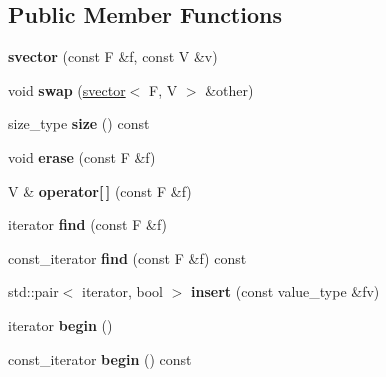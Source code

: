 \subsection*{Public Member Functions}
\begin{DoxyCompactItemize}
\item 
\hypertarget{classsvector_af80c78063c502c408ce9de9e29802c4e}{
{\bfseries svector} (const F \&f, const V \&v)}
\label{classsvector_af80c78063c502c408ce9de9e29802c4e}

\item 
\hypertarget{classsvector_a7f6261a28ccf2e7e38b8921716a35e3b}{
void {\bfseries swap} (\hyperlink{classsvector}{svector}$<$ F, V $>$ \&other)}
\label{classsvector_a7f6261a28ccf2e7e38b8921716a35e3b}

\item 
\hypertarget{classsvector_ad6df678466732e7a17ea1b1223ff7747}{
size\_\-type {\bfseries size} () const }
\label{classsvector_ad6df678466732e7a17ea1b1223ff7747}

\item 
\hypertarget{classsvector_aa7a575ad6a3a810adf89785b4a5d49b3}{
void {\bfseries erase} (const F \&f)}
\label{classsvector_aa7a575ad6a3a810adf89785b4a5d49b3}

\item 
\hypertarget{classsvector_ae1a20b7ecc6899bc36f6c74c09b80f21}{
V \& {\bfseries operator\mbox{[}$\,$\mbox{]}} (const F \&f)}
\label{classsvector_ae1a20b7ecc6899bc36f6c74c09b80f21}

\item 
\hypertarget{classsvector_a8654fa07ce4f88f6f1f781ddd4968da9}{
iterator {\bfseries find} (const F \&f)}
\label{classsvector_a8654fa07ce4f88f6f1f781ddd4968da9}

\item 
\hypertarget{classsvector_ab57caec3eab9d57eaec2ad1c436fc3d6}{
const\_\-iterator {\bfseries find} (const F \&f) const }
\label{classsvector_ab57caec3eab9d57eaec2ad1c436fc3d6}

\item 
\hypertarget{classsvector_a8a296d1d27c0242a6d8c89d4fdf67388}{
std::pair$<$ iterator, bool $>$ {\bfseries insert} (const value\_\-type \&fv)}
\label{classsvector_a8a296d1d27c0242a6d8c89d4fdf67388}

\item 
\hypertarget{classsvector_ad62a2162f09c4d4ea2b9ab9a93ebdfdd}{
iterator {\bfseries begin} ()}
\label{classsvector_ad62a2162f09c4d4ea2b9ab9a93ebdfdd}

\item 
\hypertarget{classsvector_a24c1e2612bd13a2bf259dc2627675dfa}{
const\_\-iterator {\bfseries begin} () const }
\label{classsvector_a24c1e2612bd13a2bf259dc2627675dfa}


\end{DoxyCompactItemize}
